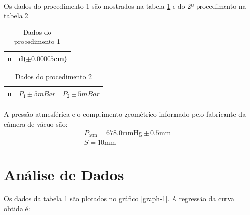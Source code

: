 \documentclass[a4paper,11pt]{article}
\begin{document}
\paragraph{} Os dados do procedimento 1 são mostrados na tabela \ref{tab:proced1} e do 2º procedimento na tabela \ref{tab:proced2}
\FloatBarrier
\begin{table}[!htp]
	\centering
	\begin{tabular}{|l|l|}\hline
	n & d($\pm 0.00005$cm) \\ \hline
	
	\end{tabular}
	\caption{Dados do procedimento 1}
	\label{tab:proced1}
\end{table}
\FloatBarrier
\FloatBarrier
\begin{table}[!htp]
\centering	
	\begin{tabular}{|l|l|l|}\hline
	n & $P_1 \pm 5mBar$ & $P_2 \pm 5mBar$ \\ \hline
	
	\end{tabular}
	\caption{Dados do procedimento 2}
	\label{tab:proced2}

\end{table}
\FloatBarrier
\paragraph{} A pressão atmosférica e o comprimento geométrico informado pelo fabricante da câmera de vácuo são:
\begin{equation}
\begin{array}{l}
	P_{\mbox{atm}} = 678.0 \mbox{mmHg} \pm 0.5\mbox{mm}\\
	S = 10 \mbox{mm}
\end{array}
\end{equation}
\newpage
\section{Análise de Dados}
\paragraph{} Os dados da tabela \ref{tab:proced1} são plotados no gráfico \ref{graph-1}. A regressão da curva obtida é:

\begin{equation}
	
\end{equation}
\end{document}
